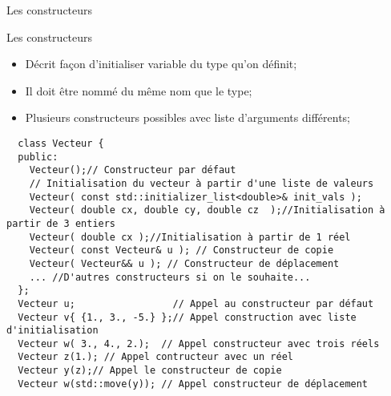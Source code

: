 \documentclass[compress,10pt,aspectratio=169]{beamer}
\begin{document}
\begin{frame}[fragile]{Les constructeurs}
  \scriptsize
  \vspace*{-3mm}
  \begin{block}{\small Les constructeurs}
    \vspace*{-3mm}
    \begin{multicols}{2}
      \begin{itemize}
  \item Décrit façon d'initialiser variable du type qu'on définit;
  \item Il doit être nommé du même nom que le type;
  \item Plusieurs constructeurs possibles avec liste d'arguments différents;
  \end{itemize}
\end{multicols}
\end{block}
  \begin{verbatim}
  class Vecteur {
  public:
    Vecteur();// Constructeur par défaut
    // Initialisation du vecteur à partir d'une liste de valeurs
    Vecteur( const std::initializer_list<double>& init_vals );
    Vecteur( double cx, double cy, double cz  );//Initialisation à partir de 3 entiers
    Vecteur( double cx );//Initialisation à partir de 1 réel
    Vecteur( const Vecteur& u ); // Constructeur de copie
    Vecteur( Vecteur&& u ); // Constructeur de déplacement
    ... //D'autres constructeurs si on le souhaite...
  };  
  Vecteur u;                 // Appel au constructeur par défaut
  Vecteur v{ {1., 3., -5.} };// Appel construction avec liste d'initialisation
  Vecteur w( 3., 4., 2.);  // Appel constructeur avec trois réels
  Vecteur z(1.); // Appel contructeur avec un réel
  Vecteur y(z);// Appel le constructeur de copie
  Vecteur w(std::move(y)); // Appel constructeur de déplacement
  \end{verbatim}
  \end{frame}
\end{document}
